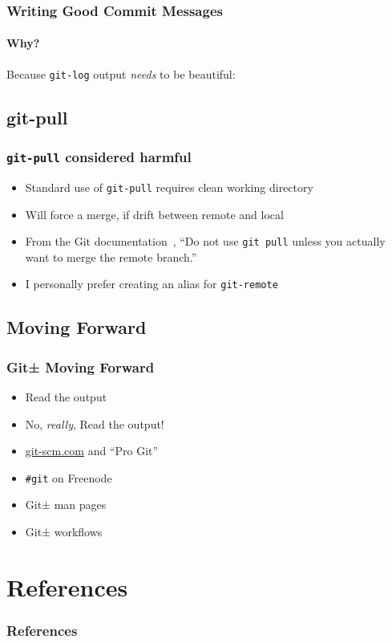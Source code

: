 \documentclass{beamer}
\begin{document}
\begin{frame}[fragile]
\frametitle{Writing Good Commit Messages}
\framesubtitle{Why?}
Because \texttt{git-log} output \textit{needs} to be beautiful:

\end{frame}

\subsection{git-pull}
\begin{frame}[fragile]
\frametitle{\texttt{git-pull} considered harmful}
\begin{itemize}
\item{Standard use of \texttt{git-pull} requires clean working directory}
\item{Will force a merge, if drift between remote and local}
\item{From the Git documentation~\cite{website:gitworkflows7}, ``Do not use
\texttt{git pull} unless you actually want to merge the remote branch.''}
\item{I personally prefer creating an alias for \texttt{git-remote}}
\end{itemize}

\end{frame}

\subsection{Moving Forward}
\begin{frame}
\frametitle{Git± Moving Forward}
\begin{itemize}
\item<2->{Read the output}
\item<3->{No, \textit{really}, Read the output!}
\item<4->{\url{git-scm.com} and ``Pro Git''}
\item<5->{\texttt{\#{}git} on Freenode}
\item<6->{Git± man pages~\cite{website:git_man_pages}}
\item<7->{Git± workflows~\cite{website:gitworkflows7}}
\end{itemize}
\end{frame}

\section*{References}
\begin{frame}[allowframebreaks]
\frametitle{References}
\nocite{*}
\renewcommand{\refname}{}


\end{frame}

\end{document}
